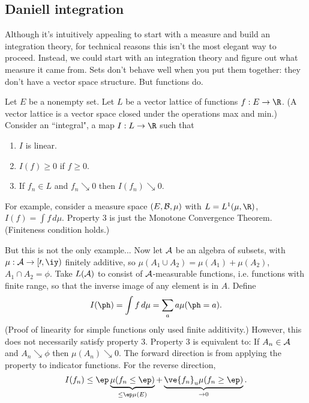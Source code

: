 \subsection{Daniell integration}
Although it's intuitively appealing to start with a measure and build an integration theory, for technical reasons this isn't the most elegant way to proceed. Instead, we could start with an integration theory and figure out what measure it came from. 
Sets don't behave well when you put them together: they don't have a vector space structure. But functions do.

Let $E$ be a nonempty set. Let $L$ be a vector lattice of functions $f:E\to \R$. (A vector lattice is a vector space closed under the operations max and min.) Consider an ``integral", a map $I:L\to \R$ such that
\begin{enumerate}
\item
$I$ is linear.
\item $I(f)\ge 0$ if $f\ge 0$.
\item If $f_n\in L$ and $f_n\searrow 0$ then $I(f_n)\searrow 0$.
\end{enumerate}
For example, consider a measure space $(E,\cal B, \mu)$ with $L=L^1(\mu, \R)$, $I(f)=\int f\,d\mu$. Property 3 is just the Monotone Convergence Theorem. (Finiteness condition holds.) 

But this is not the only example... 
Now let $\cal A$ be an algebra of subsets, with $\mu:\cal A\to [0,\iy)$ finitely additive, so $\mu(A_1\cup A_2)=\mu(A_1)+\mu(A_2)$, $A_1\cap A_2=\phi$. Take $L(\cal A)$ to consist of $\cal A$-measurable functions, i.e. functions with finite range, so that the inverse image of any element is in $A$. Define
\[
I(\ph)=\int f\,d\mu=\sum_{a}a\mu(\ph=a).
\]
(Proof of linearity for simple functions only used finite additivity.)
However, this does not necessarily satisfy property 3. Property 3 is equivalent to: If $A_n\in \cal A$ and $A_n\searrow \phi$ then $\mu(A_n)\searrow 0$. The forward direction is from applying the property to indicator functions. For the reverse direction, 
\[I(f_n)\le\ep \underbrace{\mu(f_n\le \ep)}_{\le\ep \mu(E)}+\underbrace{\ve{f_n}_u\mu(f_n\ge \ep)}_{\to 0}.\]


